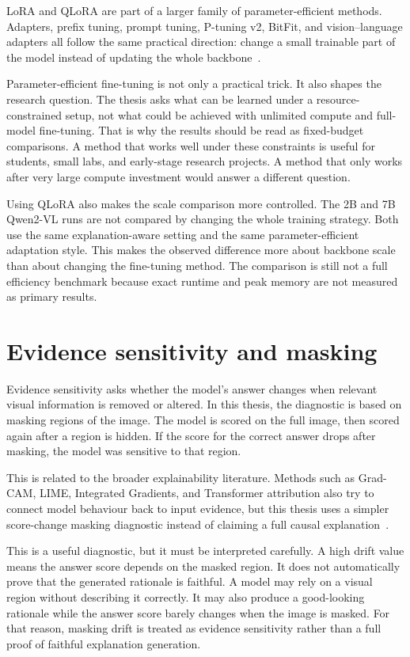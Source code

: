 LoRA and QLoRA are part of a larger family of parameter-efficient methods.
Adapters, prefix tuning, prompt tuning, P-tuning v2, BitFit, and vision--language adapters all follow the same practical direction:
change a small trainable part of the model instead of updating the whole backbone~\cite{houlsby2019adapters,li2021prefix,lester2021prompt,liu2022ptuningv2,zaken2022bitfit,sung2022vladapter}.

Parameter-efficient fine-tuning is not only a practical trick.
It also shapes the research question.
The thesis asks what can be learned under a resource-constrained setup, not what could be achieved with unlimited compute and full-model fine-tuning.
That is why the results should be read as fixed-budget comparisons.
A method that works well under these constraints is useful for students, small labs, and early-stage research projects.
A method that only works after very large compute investment would answer a different question.

Using QLoRA also makes the scale comparison more controlled.
The 2B and 7B Qwen2-VL runs are not compared by changing the whole training strategy.
Both use the same explanation-aware setting and the same parameter-efficient adaptation style.
This makes the observed difference more about backbone scale than about changing the fine-tuning method.
The comparison is still not a full efficiency benchmark because exact runtime and peak memory are not measured as primary results.

\section{Evidence sensitivity and masking}
Evidence sensitivity asks whether the model's answer changes when relevant visual information is removed or altered.
In this thesis, the diagnostic is based on masking regions of the image.
The model is scored on the full image, then scored again after a region is hidden.
If the score for the correct answer drops after masking, the model was sensitive to that region.

This is related to the broader explainability literature.
Methods such as Grad-CAM, LIME, Integrated Gradients, and Transformer attribution also try to connect model behaviour back to input evidence,
but this thesis uses a simpler score-change masking diagnostic instead of claiming a full causal explanation~\cite{selvaraju2017gradcam,ribeiro2016lime,sundararajan2017axiomatic,chefer2021transformer}.

This is a useful diagnostic, but it must be interpreted carefully.
A high drift value means the answer score depends on the masked region.
It does not automatically prove that the generated rationale is faithful.
A model may rely on a visual region without describing it correctly.
It may also produce a good-looking rationale while the answer score barely changes when the image is masked.
For that reason, masking drift is treated as evidence sensitivity rather than a full proof of faithful explanation generation.


